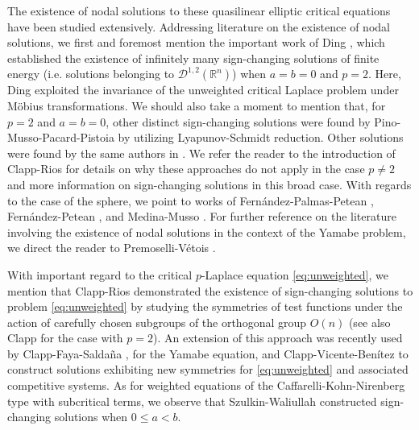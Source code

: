 \documentclass[10pt, reqno]{amsart}
\newcommand{\RR}{\mathbb{R}}
\newcommand{\D}{\mathcal{D}}
\numberwithin{equation}{section}
\theoremstyle{definition}
\theoremstyle{remark}
\theoremstyle{plain}
\begin{document}
	The existence of nodal solutions to these quasilinear elliptic critical equations have been studied extensively. Addressing literature on the existence of nodal solutions, we first and foremost mention the important work of Ding \cite{ding}, which established the existence of infinitely many sign-changing solutions of finite energy (i.e. solutions belonging to $\D^{1,2}(\RR^n)$) when $a=b = 0$ and $p=2$. Here, Ding exploited the invariance of the unweighted critical Laplace problem under M\"obius transformations. We should also take a moment to mention that, for $p=2$ and $a=b=0$, other distinct sign-changing solutions were found by Pino-Musso-Pacard-Pistoia \cite{musso} by utilizing Lyapunov-Schmidt reduction. Other solutions were found by the same authors in \cite{del2013torus}. We refer the reader to the introduction of Clapp-Rios \cite{clappRios} for details on why these approaches do not apply in the case $p \ne 2$ and more information on sign-changing solutions in this broad case. With regards to the case of the sphere, we point to works of Fern\'andez-Palmas-Petean \cite{fernandezPalmasPetean}, Fern\'andez-Petean \cite{fernandez2020low}, and Medina-Musso \cite{medinaMusso}. For further reference on the literature involving the existence of nodal solutions in the context of the Yamabe problem, we direct the reader to Premoselli-V\'etois \cite[\S2]{premo}. 
	
	With important regard to the critical $p$-Laplace equation \eqref{eq:unweighted}, we mention that Clapp-Rios \cite{clappRios} demonstrated the existence of sign-changing solutions to problem \eqref{eq:unweighted} by studying the symmetries of test functions under the action of carefully chosen subgroups of the orthogonal group $O(n)$ (see also Clapp \cite{Clapp_pure} for the case with $p=2$). An extension of this approach was recently used by Clapp-Faya-Salda\~na \cite{Clapp_2024}, for the Yamabe equation, and Clapp-Vicente-Ben\'itez \cite{clapp2026entire} to construct solutions exhibiting new symmetries for \eqref{eq:unweighted} and associated competitive systems. As for weighted equations of the Caffarelli-Kohn-Nirenberg type with subcritical terms, we observe that Szulkin-Waliullah \cite{szulkin2012sign} constructed sign-changing solutions when $0 \le a < b$.
	
\end{document}
